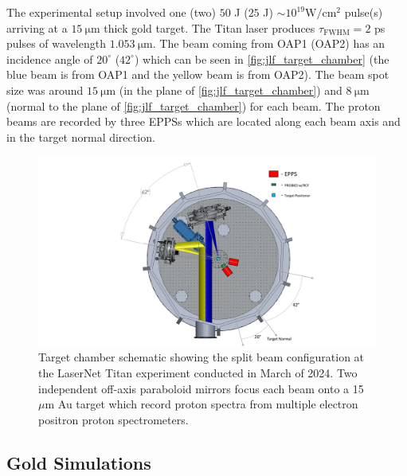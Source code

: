 The experimental setup involved one (two) $50$ J ($25$ J) $\sim 10^{19} \unit{\watt \per \centi \meter \squared}$ pulse(s) arriving at a $\SI{15}{\micro \meter}$ thick gold target. The Titan laser produces $\tau_\text{FWHM} = 2$ ps pulses of wavelength $\SI{1.053}{\micro \meter}$. The beam coming from \gls{OAP}1 (\gls{OAP}2) has an incidence angle of $20^\circ$ ($42^\circ$) which can be seen in \autoref{fig:jlf_target_chamber} (the blue beam is from OAP1 and the yellow beam is from OAP2). The beam spot size was around $\SI{15}{\micro \meter}$ (in the plane of \autoref{fig:jlf_target_chamber}) and $\SI{8}{\micro \meter}$ (normal to the plane of \autoref{fig:jlf_target_chamber}) for each beam. The proton beams are recorded by three \gls{EPPS}s which are located along each beam axis and in the target normal direction.

\begin{figure}
	\centering
	\includegraphics[width=.95\linewidth]{planning/images/titan/target_area_JLF.pdf}
	\caption{Target chamber schematic showing the split beam configuration at the LaserNet Titan experiment conducted in March of 2024. Two independent off-axis paraboloid mirrors focus each beam onto a 15~$\mu$m Au target which record proton spectra from multiple electron positron proton spectrometers.}
	\label{fig:jlf_target_chamber}
\end{figure}

\subsection{Gold Simulations}

